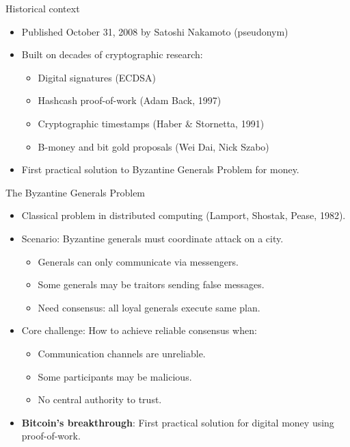 \documentclass[aspectratio=169, lualatex, handout]{beamer}
\begin{document}
\begin{frame}{Historical context}
	\begin{itemize}
		\item Published October 31, 2008 by Satoshi Nakamoto (pseudonym)
		\item Built on decades of cryptographic research:
		      \begin{itemize}
			      \item Digital signatures (ECDSA)
			      \item Hashcash proof-of-work (Adam Back, 1997)
			      \item Cryptographic timestamps (Haber \& Stornetta, 1991)
			      \item B-money and bit gold proposals (Wei Dai, Nick Szabo)
		      \end{itemize}
		\item First practical solution to Byzantine Generals Problem for money.
	\end{itemize}
\end{frame}

\begin{frame}{The Byzantine Generals Problem}
	\begin{itemize}
		\item Classical problem in distributed computing (Lamport, Shostak, Pease, 1982).
		\item Scenario: Byzantine generals must coordinate attack on a city.
		      \begin{itemize}
			      \item Generals can only communicate via messengers.
			      \item Some generals may be traitors sending false messages.
			      \item Need consensus: all loyal generals execute same plan.
		      \end{itemize}
		\item Core challenge: How to achieve reliable consensus when:
		      \begin{itemize}
			      \item Communication channels are unreliable.
			      \item Some participants may be malicious.
			      \item No central authority to trust.
		      \end{itemize}
		\item \textbf{Bitcoin's breakthrough}: First practical solution for digital money using proof-of-work.
	\end{itemize}
\end{frame}
\end{document}
